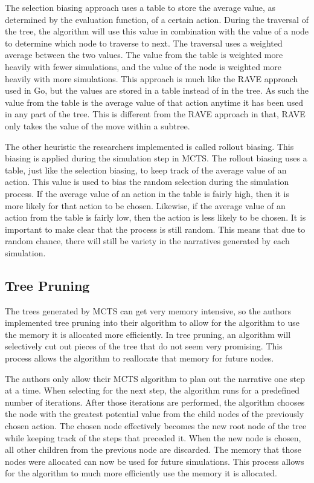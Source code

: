 \documentclass{sig-alternate}
\begin{document}
The selection biasing approach uses a table to store the average value, as determined by the evaluation function, of a certain action. During the traversal of the tree, the algorithm will use this value in combination with the value of a node to determine which node to traverse to next. The traversal uses a weighted average between the two values. The value from the table is weighted more heavily with fewer simulations, and the value of the node is weighted more heavily with more simulations. This approach is much like the RAVE approach used in Go, but the values are stored in a table instead of in the tree. As such the value from the table is the average value of that action anytime it has been used in any part of the tree. This is different from the RAVE approach in that, RAVE only takes the value of the move within a subtree.

The other heuristic the researchers implemented is called rollout biasing. This biasing is applied during the simulation step in MCTS. The rollout biasing uses a table, just like the selection biasing, to keep track of the average value of an action. This value is used to bias the random selection during the simulation process. If the average value of an action in the table is fairly high, then it is more likely for that action to be chosen. Likewise, if the average value of an action from the table is fairly low, then the action is less likely to be chosen. It is important to make clear that the process is still random. This means that due to random chance, there will still be variety in the narratives generated by each simulation.
 
\subsection{Tree Pruning}
The trees generated by MCTS can get very memory intensive, so the authors implemented tree pruning into their algorithm to allow for the algorithm to use the memory it is allocated more efficiently. In tree pruning, an algorithm will selectively cut out pieces of the tree that do not seem very promising. This process allows the algorithm to reallocate that memory for future nodes. 

The authors only allow their MCTS algorithm to plan out the narrative one step at a time. When selecting for the next step, the algorithm runs for a predefined number of iterations. After those iterations are performed, the algorithm chooses the node with the greatest potential value from the child nodes of the previously chosen action. The chosen node effectively becomes the new root node of the tree while keeping track of the steps that preceded it. When the new node is chosen, all other children from the previous node are discarded. The memory that those nodes were allocated can now be used for future simulations. This process allows for the algorithm to much more efficiently use the memory it is allocated.
\end{document}
